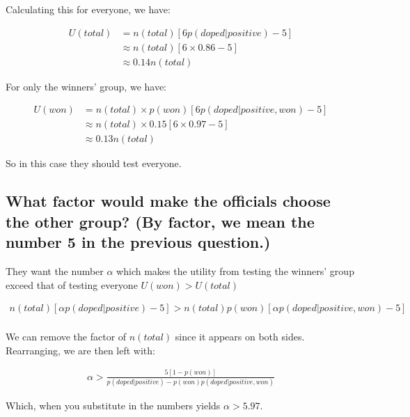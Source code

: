 \documentclass[11pt,fullpage]{book}
\begin{document}
Calculating this for everyone, we have:

\begin{equation}
\begin{align}
U(total) &= n(total)\left[6 p(doped|positive) - 5\right]\\
&\approx n(total)\left[6\times 0.86 - 5\right]\\
&\approx 0.14 n(total)
\end{align}
\end{equation}

For only the winners' group, we have:

\begin{equation}
\begin{align}
U(won) &= n(total)\times p(won)\left[6 p(doped|positive,won) - 5\right]\\
&\approx n(total) \times 0.15 \left[6 \times 0.97 - 5\right]\\
&\approx 0.13 n(total)
\end{align}
\end{equation}

So in this case they should test everyone.

\subsection{What factor would make the officials choose the other group? (By factor, we mean the number 5 in the previous question.)}
They want the number $\alpha$ which makes the utility from testing the winners' group exceed that of testing everyone $U(won) > U(total)$ \implies

\begin{equation}
\begin{align}
n(total)\left[\alpha p(doped|positive) - 5\right] > n(total)p(won)\left[\alpha p(doped|positive,won) - 5\right]\\
\end{align}
\end{equation}

We can remove the factor of $n(total)$ since it appears on both sides. Rearranging, we are then left with:

\begin{equation}
\begin{align}
\alpha > \frac{5\left[1-p(won)\right]}{p(doped|positive) - p(won) p(doped|positive,won)}
\end{align}
\end{equation}

Which, when you substitute in the numbers yields $\alpha > 5.97$. 
\end{document}

